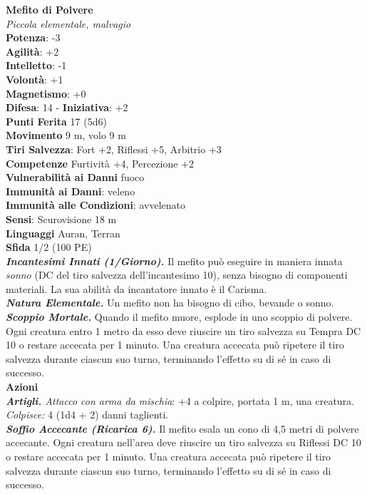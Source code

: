 \begin{multicols}{2}
\medskip\textbf{Mefito di Polvere}\\
\emph{Piccola elementale, malvagio}\\
\textbf{Potenza}: -3\\
\textbf{Agilità}: +2\\
\textbf{Intelletto}: -1\\
\textbf{Volontà}: +1\\
\textbf{Magnetismo}: +0\\
\textbf{Difesa}: 14 - \textbf{Iniziativa}: +2\\
\textbf{Punti Ferita} 17 (5d6)\\
\textbf{Movimento} 9 m, volo 9 m\\
\textbf{Tiri Salvezza}: Fort +2, Riflessi +5, Arbitrio +3\\
\textbf{Competenze} Furtività +4, Percezione +2\\
\textbf{Vulnerabilità ai Danni} fuoco\\
\textbf{Immunità ai Danni}: veleno\\
\textbf{Immunità alle Condizioni}: avvelenato\\
\textbf{Sensi}: Scurovisione 18 m\\
\textbf{Linguaggi} Auran, Terran\\
\textbf{Sfida} 1/2 (100 PE)\smallskip\\
\emph{\textbf{Incantesimi Innati (1/Giorno).}} Il mefito può eseguire in maniera innata \emph{sonno} (DC del tiro salvezza dell'incantesimo 10), senza bisogno di componenti materiali. La sua abilità da incantatore innato è il Carisma.\\
\emph{\textbf{Natura Elementale.}} Un mefito non ha bisogno di cibo, bevande o sonno.\\
\emph{\textbf{Scoppio Mortale.}} Quando il mefito muore, esplode in uno scoppio di polvere. Ogni creatura entro 1 metro da esso deve riuscire un tiro salvezza su Tempra DC 10 o restare accecata per 1 minuto. Una creatura accecata può ripetere il tiro salvezza durante ciascun suo turno, terminando l'effetto su di sé in caso di successo. \\
\smallskip\textbf{Azioni}\\
\emph{\textbf{Artigli.} Attacco con arma da mischia}: +4 a colpire, portata 1 m, una creatura.\\
\emph{Colpisce:} 4 (1d4 + 2) danni taglienti.\\
\emph{\textbf{Soffio Accecante (Ricarica 6).}} Il mefito esala un cono di 4,5 metri di polvere accecante. Ogni creatura nell'area deve riuscire un tiro salvezza su Riflessi DC 10 o restare accecata per 1 minuto. Una creatura accecata può ripetere il tiro salvezza durante ciascun suo turno, terminando l'effetto su di sé in caso di successo.\\

\end{multicols}
